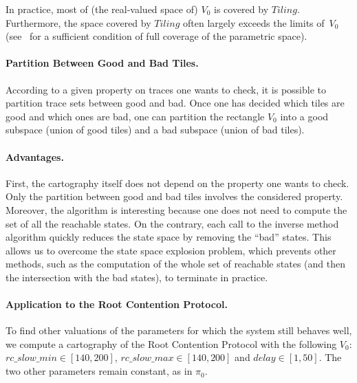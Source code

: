 \documentclass[a4paper,10pt]{article}
\newcommand{\tiling}{\mathit{Tiling}}
\newcommand{\rcpSMax}{\mathit{rc\_slow\_max}}
\newcommand{\rcpSMin}{\mathit{rc\_slow\_min}}
\newcommand{\rcpD}{\mathit{delay}}
\newcommand{\paragraphe}[1]{\paragraph{#1.}}
\begin{document}
In practice, most of (the real-valued space of) $V_0$ is covered by $\tiling$.
Furthermore, the space covered by $\tiling$ often largely exceeds the limits of~$V_0$ (see~\cite{af10} for a sufficient condition of full coverage of the parametric space).



\paragraphe{Partition Between Good and Bad Tiles}
According to a given property on traces one wants to check, it is possible to partition trace sets between good and bad.
Once one has decided which tiles are good and which ones are bad, one can partition the rectangle $V_0$ into a good subspace %
(union of good tiles) and a bad subspace (union of bad tiles). %


\paragraphe{Advantages}
First, the cartography itself does not depend on the property one wants to check.
Only the partition between good and bad tiles involves the considered property.
Moreover, the algorithm is interesting because one does not need to compute the set of all the reachable states.
On the contrary, each call to the inverse method algorithm quickly reduces the state space by removing the ``bad'' states.
This allows us to overcome the state space explosion problem, which prevents other methods, such as the computation of the whole set of reachable states (and then the intersection with the bad states), to terminate in practice.


\paragraphe{Application to the Root Contention Protocol}
To find other valuations of the parameters for which the system still behaves well, we compute a cartography of the Root Contention Protocol with the following $V_0$:
$\rcpSMin \in [ 140, 200 ] $, $\rcpSMax \in [ 140, 200 ]$ and $\rcpD \in [ 1, 50 ] $.
The two other parameters remain constant, as in $\pi_0$.
\end{document}
